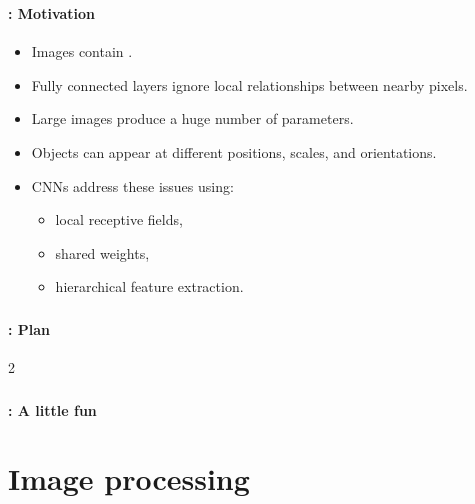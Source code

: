 \documentclass[xcolor=table]{beamer}
\subtitle[CNNs]{Convolutional Neural Networks}
\begin{document}
\begin{frame}
	\frametitle{\inserttitle}
	\framesubtitle{\insertshortsubtitle: Motivation}
	
	\begin{itemize}
		\item Images contain .
		
		\item Fully connected layers ignore local relationships between nearby pixels.
		
		\item Large images produce a huge number of parameters.
		
		\item Objects can appear at different positions, scales, and orientations.
		
		\item CNNs address these issues using:
		\begin{itemize}
			\item local receptive fields,
			\item shared weights,
			\item hierarchical feature extraction.
		\end{itemize}
	\end{itemize}
	
	\begin{center}
	\end{center}
	
\end{frame}

\begin{frame}
	\frametitle{\inserttitle}
	\framesubtitle{\insertshortsubtitle: Plan}
	
	\begin{multicols}{2}
		\tableofcontents
	\end{multicols}
\end{frame}

\begin{frame}
	\frametitle{\inserttitle}
	\framesubtitle{\insertshortsubtitle: A little fun}
	
	
\end{frame}

\section{Image processing}
\end{document}
